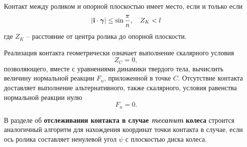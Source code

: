 Контакт между роликом и опорной плоскостью имеет место, если и только если
\begin{equation}\label{cond:rol_vert}
    \left| \boldsymbol{\mathbf{i}} \cdot \boldsymbol{\mathbf{\gamma}} \right| \le \sin\displaystyle\frac{\displaystyle \pi}{\displaystyle n},\quad Z_K < l
\end{equation}
где $Z_K$ -- расстояние от центра ролика до опорной плоскости.

Реализация контакта геометрически означает выполнение скалярного условия
\begin{equation}\label{cond:rol_zero}
    Z_C = 0,
\end{equation}
позволяющего, вместе с уравнениями динамики твердого тела, вычислить величину нормальной реакции $F_n$, приложенной в точке $C$. Отсутствие контакта доставляет выполнение альтернативного, также скалярного, условия равенства нормальной реакции нулю
$$
    F_n = 0.
$$

В разделе об \textbf{отслеживании контакта в случае \textit{mecanum} колеса} строится аналогичный алгоритм для нахождения координат точки контакта в случае, если ось ролика составляет ненулевой угол $\psi$ с плоскостью диска колеса.

%

